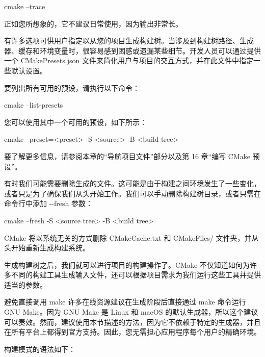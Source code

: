 \begin{shell}
cmake --trace
\end{shell}

正如您所想象的，它不建议日常使用，因为输出非常长。


有许多选项可供用户指定以从您的项目生成构建树。当涉及到构建树路径、生成器、缓存和环境变量时，很容易感到困惑或遗漏某些细节。开发人员可以通过提供一个 CMakePresets.json 文件来简化用户与项目的交互方式，并在此文件中指定一些默认设置。

要列出所有可用的预设，请执行以下命令：

\begin{shell}
cmake --list-presets
\end{shell}

您可以使用其中一个可用的预设，如下所示：

\begin{shell}
cmake --preset=<preset> -S <source> -B <build tree>
\end{shell}

要了解更多信息，请参阅本章的“导航项目文件”部分以及第 16 章“编写 CMake 预设”。


有时我们可能需要删除生成的文件。这可能是由于构建之间环境发生了一些变化，或者只是为了确保我们从头开始工作。我们可以手动删除构建树目录，或者只需在命令行中添加 -{}-fresh 参数：

\begin{shell}
cmake --fresh -S <source tree> -B <build tree>
\end{shell}

CMake 将以系统无关的方式删除 CMakeCache.txt 和 CMakeFiles/ 文件夹，并从头开始重新生成构建系统。


生成构建树之后，我们就可以进行项目的构建操作了。CMake 不仅知道如何为许多不同的构建工具生成输入文件，还可以根据项目需求为我们运行这些工具并提供适当的参数。

\begin{myNotic}{避免直接调用 make}
许多在线资源建议在生成阶段后直接通过 make 命令运行 GNU Make。因为 GNU Make 是 Linux 和 macOS 的默认生成器，所以这个建议可以奏效。然而，建议使用本节描述的方法，因为它不依赖于特定的生成器，并且在所有平台上都得到官方支持。因此，您无需担心应用程序每个用户的精确环境。
\end{myNotic}

构建模式的语法如下：

